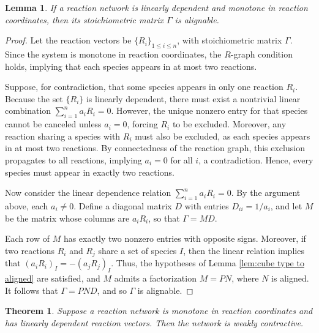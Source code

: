 \documentclass{article}
\newtheorem{thm}{Theorem}
\newtheorem{lem}{Lemma}
\begin{document}
\begin{lem}
\label{lem:react coord alignable}
If a reaction network is linearly dependent and monotone in reaction coordinates, then its stoichiometric matrix \( \Gamma \) is alignable.
\end{lem}

\begin{proof}
Let the reaction vectors be \( \{R_i\}_{1 \leq i \leq n} \), with stoichiometric matrix \( \Gamma \). Since the system is monotone in reaction coordinates, the \( R \)-graph condition holds, implying that each species appears in at most two reactions.

Suppose, for contradiction, that some species appears in only one reaction \( R_i \). Because the set \( \{R_i\} \) is linearly dependent, there must exist a nontrivial linear combination \( \sum_{i=1}^n a_i R_i = 0 \). However, the unique nonzero entry for that species cannot be canceled unless \( a_i = 0 \), forcing \( R_i \) to be excluded. Moreover, any reaction sharing a species with \( R_i \) must also be excluded, as each species appears in at most two reactions. By connectedness of the reaction graph, this exclusion propagates to all reactions, implying \( a_i = 0 \) for all \( i \), a contradiction. Hence, every species must appear in exactly two reactions.

Now consider the linear dependence relation \( \sum_{i=1}^n a_i R_i = 0 \). By the argument above, each \( a_i \neq 0 \). Define a diagonal matrix \( D \) with entries \( D_{ii} = 1/a_i \), and let \( M \) be the matrix whose columns are \( a_i R_i \), so that \( \Gamma = M D \).

Each row of \( M \) has exactly two nonzero entries with opposite signs. Moreover, if two reactions \( R_i \) and \( R_j \) share a set of species \( I \), then the linear relation implies that \( (a_i R_i)_I = -(a_j R_j)_I \). Thus, the hypotheses of Lemma \ref{lem:cube type to aligned} are satisfied, and \( M \) admits a factorization \( M = P N \), where \( N \) is aligned. It follows that \( \Gamma = P N D \), and so \( \Gamma \) is alignable.
\end{proof}





\begin{thm}
\label{thm:dependent reaction monotone is contractive}
Suppose a reaction network is monotone in reaction coordinates and has linearly dependent reaction vectors. Then the network is weakly contractive.
\end{thm}
\end{document}
